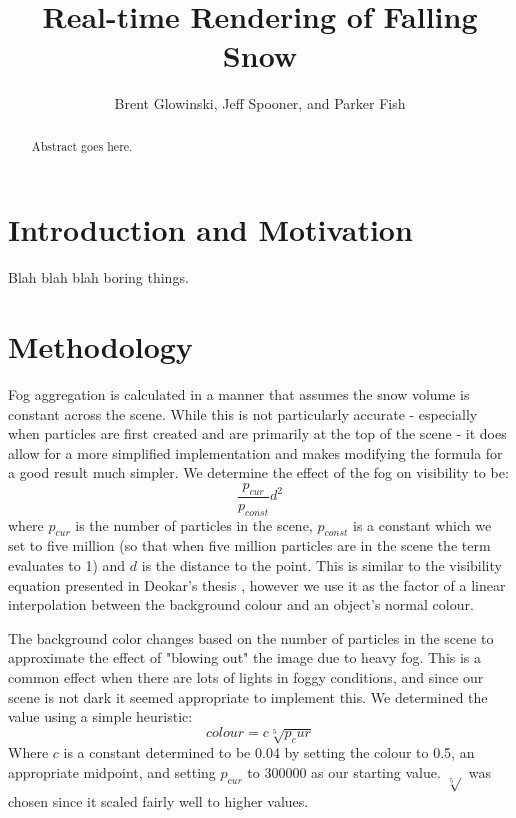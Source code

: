 \documentclass[conference]{acmsiggraph}
\title{Real-time Rendering of Falling Snow}
\author{Brent Glowinski, Jeff Spooner, and Parker Fish}
\begin{document}
\maketitle

\begin{abstract}

Abstract goes here.

\end{abstract}

\keywordlist

\copyrightspace

\section{Introduction and Motivation}
Blah blah blah boring things.

\section{Methodology}
Fog aggregation is calculated in a manner that assumes the snow volume is constant across the scene. While this is not particularly accurate - especially when particles are first created and are primarily at the top of the scene - it does allow for a more simplified implementation and makes modifying the formula for a good result much simpler. We determine the effect of the fog on visibility to be:
\begin{equation} \label{eq:fog}
\frac{p_{cur}}{p_{const}}d^2
\end{equation}
where $p_{cur}$ is the number of particles in the scene, $p_{const}$ is a constant which we set to five million (so that when five million particles are in the scene the term evaluates to 1) and $d$ is the distance to the point. This is similar to the visibility equation presented in Deokar's thesis \cite{deokar09}, however we use it as the factor of a linear interpolation between the background colour and an object's normal colour.

The background color changes based on the number of particles in the scene to approximate the effect of "blowing out" the image due to heavy fog. This is a common effect when there are lots of lights in foggy conditions, and since our scene is not dark it seemed appropriate to implement this. We determined the value using a simple heuristic:
\begin{equation} \label{eq:bgcolor}
colour = c\sqrt[5]{p_cur}
\end{equation}
Where $c$ is a constant determined to be 0.04 by setting the colour to 0.5, an appropriate midpoint, and setting $p_{cur}$ to 300000 as our starting value. $\sqrt[5]{}$ was chosen since it scaled fairly well to higher values.
\end{document}
